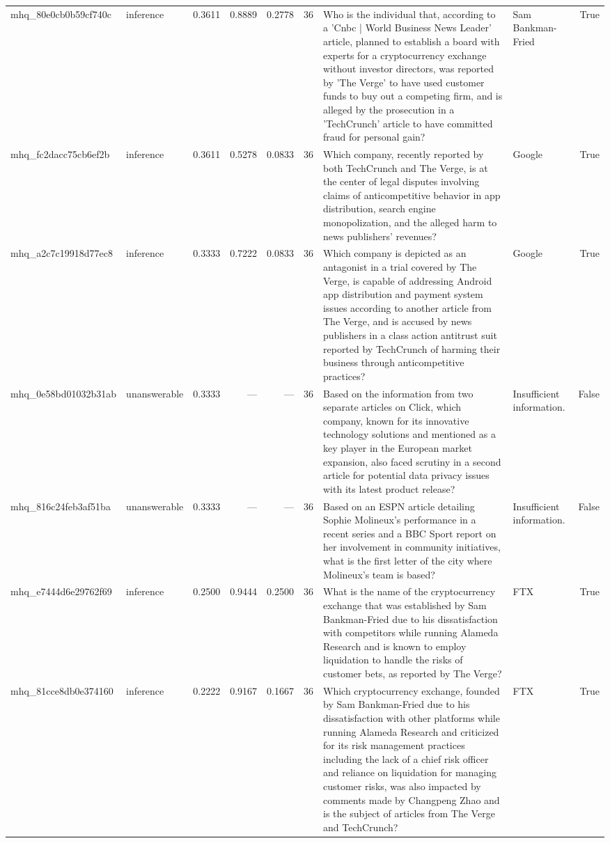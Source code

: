 \begin{tabular}{llrrrrllr}
mhq_80e0cb0b59cf740c & inference & 0.3611 & 0.8889 & 0.2778 & 36 & Who is the individual that, according to a 'Cnbc | World Business News Leader' article, planned to establish a board with experts for a cryptocurrency exchange without investor directors, was reported by 'The Verge' to have used customer funds to buy out a competing firm, and is alleged by the prosecution in a 'TechCrunch' article to have committed fraud for personal gain? & Sam Bankman-Fried & True \\
mhq_fc2dacc75cb6ef2b & inference & 0.3611 & 0.5278 & 0.0833 & 36 & Which company, recently reported by both TechCrunch and The Verge, is at the center of legal disputes involving claims of anticompetitive behavior in app distribution, search engine monopolization, and the alleged harm to news publishers' revenues? & Google & True \\
mhq_a2c7c19918d77ec8 & inference & 0.3333 & 0.7222 & 0.0833 & 36 & Which company is depicted as an antagonist in a trial covered by The Verge, is capable of addressing Android app distribution and payment system issues according to another article from The Verge, and is accused by news publishers in a class action antitrust suit reported by TechCrunch of harming their business through anticompetitive practices? & Google & True \\
mhq_0e58bd01032b31ab & unanswerable & 0.3333 & — & — & 36 & Based on the information from two separate articles on Click, which company, known for its innovative technology solutions and mentioned as a key player in the European market expansion, also faced scrutiny in a second article for potential data privacy issues with its latest product release? & Insufficient information. & False \\
mhq_816c24feb3af51ba & unanswerable & 0.3333 & — & — & 36 & Based on an ESPN article detailing Sophie Molineux's performance in a recent series and a BBC Sport report on her involvement in community initiatives, what is the first letter of the city where Molineux's team is based? & Insufficient information. & False \\
mhq_e7444d6e29762f69 & inference & 0.2500 & 0.9444 & 0.2500 & 36 & What is the name of the cryptocurrency exchange that was established by Sam Bankman-Fried due to his dissatisfaction with competitors while running Alameda Research and is known to employ liquidation to handle the risks of customer bets, as reported by The Verge? & FTX & True \\
mhq_81cce8db0e374160 & inference & 0.2222 & 0.9167 & 0.1667 & 36 & Which cryptocurrency exchange, founded by Sam Bankman-Fried due to his dissatisfaction with other platforms while running Alameda Research and criticized for its risk management practices including the lack of a chief risk officer and reliance on liquidation for managing customer risks, was also impacted by comments made by Changpeng Zhao and is the subject of articles from The Verge and TechCrunch? & FTX & True \\

\end{tabular}
